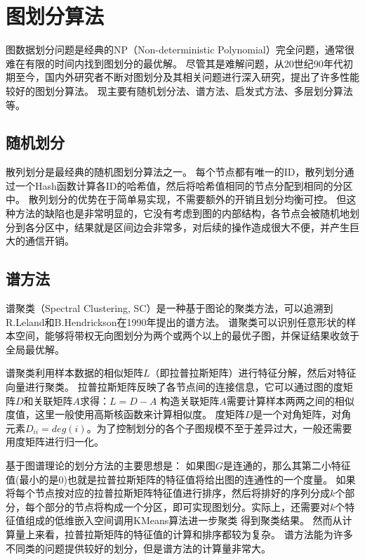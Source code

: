 \section{图划分算法}

图数据划分问题是经典的NP（Non-deterministic Polynomial）完全问题，通常很难在有限的时间内找到图划分的最优解。
尽管其是难解问题，从20世纪90年代初期至今，国内外研究者不断对图划分及其相关问题进行深入研究，提出了许多性能较好的图划分算法。
现主要有随机划分法、谱方法、启发式方法、多层划分算法等。

\subsection{随机划分}

散列划分是最经典的随机图划分算法之一。
每个节点都有唯一的ID，散列划分通过一个Hash函数计算各ID的哈希值，然后将哈希值相同的节点分配到相同的分区中。
散列划分的优势在于简单易实现，不需要额外的开销且划分均衡可控。
但这种方法的缺陷也是非常明显的，它没有考虑到图的内部结构，各节点会被随机地划分到各分区中，结果就是区间边会非常多，对后续的操作造成很大不便，并产生巨大的通信开销。



\subsection{谱方法}

谱聚类（Spectral Clustering, SC）是一种基于图论的聚类方法，可以追溯到R.Leland和B.Hendrickson在1990年提出的谱方法。
谱聚类可以识别任意形状的样本空间，能够将带权无向图划分为两个或两个以上的最优子图，并保证结果收敛于全局最优解。

谱聚类利用样本数据的相似矩阵$L$（即拉普拉斯矩阵）进行特征分解，然后对特征向量进行聚类。
拉普拉斯矩阵反映了各节点间的连接信息，它可以通过图的度矩阵$D$和关联矩阵$A$求得：$L=D-A$
构造关联矩阵$A$需要计算样本两两之间的相似度值，这里一般使用高斯核函数来计算相似度。
度矩阵$D$是一个对角矩阵，对角元素$D_{ii}=deg⁡(i)$。为了控制划分的各个子图规模不至于差异过大，一般还需要用度矩阵进行归一化。

基于图谱理论的划分方法的主要思想是：
如果图$G$是连通的，那么其第二小特征值(最小的是$0$)也就是拉普拉斯矩阵的特征值将给出图的连通性的一个度量。
如果将每个节点按对应的拉普拉斯矩阵特征值进行排序，然后将排好的序列分成$k$个部分，每个部分的节点将构成一个分区，即可实现图划分。实际上，还需要对$k$个特征值组成的低维嵌入空间调用KMeans算法进一步聚类
得到聚类结果。
然而从计算量上来看，拉普拉斯矩阵的特征值的计算和排序都较为复杂。
谱方法能为许多不同类的问题提供较好的划分，但是谱方法的计算量非常大。

